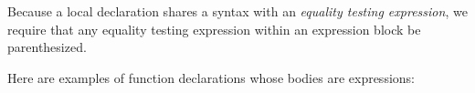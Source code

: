 Because a local declaration shares a syntax with an
\emph{equality testing expression}, we require that any equality testing
expression within an expression block be parenthesized.


Here are examples of function
declarations whose bodies are  expressions:









